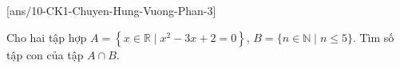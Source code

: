 
\caukq
{}[ans/10-CK1-Chuyen-Hung-Vuong-Phan-3]
\begin{ex}%
Cho hai tập hợp $A=\left\{x\in\mathbb{R}\mid x^2-3x+2=0\right\}$, $B=\{n\in\mathbb{N}\mid n\le 5\}$. Tìm số tập con của tập $A\cap B$.
\end{ex}

